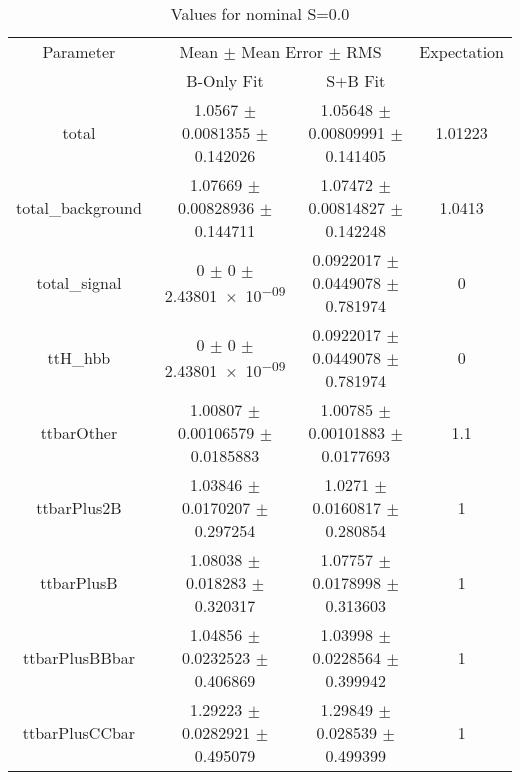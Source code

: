 \begin{table}
\centering
\caption{Values for nominal S=0.0}
\begin{tabular}{cccc}
\toprule
Parameter & \multicolumn{2}{c}{Mean $\pm$ Mean Error $\pm$ RMS} & Expectation\\
 & B-Only Fit & S+B Fit & \\
\midrule
total & \num{1.0567} $\pm$ \num{0.0081355} $\pm$ \num{0.142026} & \num{1.05648} $\pm$ \num{0.00809991} $\pm$ \num{0.141405} & \num{1.01223}\\
total\_background & \num{1.07669} $\pm$ \num{0.00828936} $\pm$ \num{0.144711} & \num{1.07472} $\pm$ \num{0.00814827} $\pm$ \num{0.142248} & \num{1.0413}\\
total\_signal & \num{0} $\pm$ \num{0} $\pm$ \num{2.43801e-09} & \num{0.0922017} $\pm$ \num{0.0449078} $\pm$ \num{0.781974} & \num{0}\\
ttH\_hbb & \num{0} $\pm$ \num{0} $\pm$ \num{2.43801e-09} & \num{0.0922017} $\pm$ \num{0.0449078} $\pm$ \num{0.781974} & \num{0}\\
ttbarOther & \num{1.00807} $\pm$ \num{0.00106579} $\pm$ \num{0.0185883} & \num{1.00785} $\pm$ \num{0.00101883} $\pm$ \num{0.0177693} & \num{1.1}\\
ttbarPlus2B & \num{1.03846} $\pm$ \num{0.0170207} $\pm$ \num{0.297254} & \num{1.0271} $\pm$ \num{0.0160817} $\pm$ \num{0.280854} & \num{1}\\
ttbarPlusB & \num{1.08038} $\pm$ \num{0.018283} $\pm$ \num{0.320317} & \num{1.07757} $\pm$ \num{0.0178998} $\pm$ \num{0.313603} & \num{1}\\
ttbarPlusBBbar & \num{1.04856} $\pm$ \num{0.0232523} $\pm$ \num{0.406869} & \num{1.03998} $\pm$ \num{0.0228564} $\pm$ \num{0.399942} & \num{1}\\
ttbarPlusCCbar & \num{1.29223} $\pm$ \num{0.0282921} $\pm$ \num{0.495079} & \num{1.29849} $\pm$ \num{0.028539} $\pm$ \num{0.499399} & \num{1}\\
\bottomrule
\end{tabular}
\end{table}